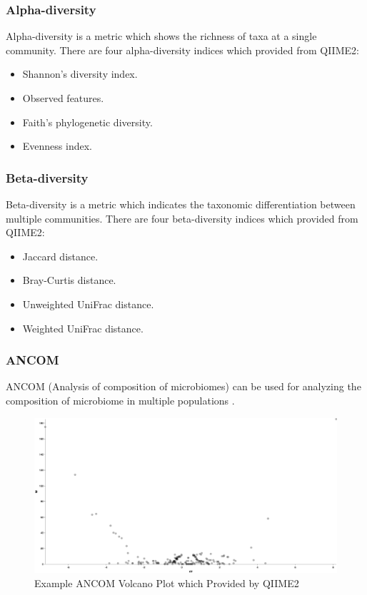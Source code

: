 \documentclass[a4paper]{article}
\begin{document}
            \subsubsection{Alpha-diversity}
                Alpha-diversity is a metric which shows the richness of taxa at a single community. There are four alpha-diversity indices which provided from QIIME2:
                \begin{itemize}
                    \item Shannon's diversity index.
                    \item Observed features.
                    \item Faith's phylogenetic diversity.
                    \item Evenness index.
                \end{itemize}

            \subsubsection{Beta-diversity}
                Beta-diversity is a metric which indicates the taxonomic differentiation between multiple communities. There are four beta-diversity indices which provided from QIIME2:
                \begin{itemize}
                    \item Jaccard distance.
                    \item Bray-Curtis distance.
                    \item Unweighted UniFrac distance.
                    \item Weighted UniFrac distance.
                \end{itemize}

            \subsubsection{ANCOM}
                ANCOM (Analysis of composition of microbiomes) can be used for analyzing the composition of microbiome in multiple populations \cite{ANCOM1}.

                \begin{figure}[p]
                    \centering
                    \includegraphics[width=0.8 \linewidth]{figures/ANCOM/example.png}
                    \caption{Example ANCOM Volcano Plot which Provided by QIIME2 \protect\cite{qiime1, qiime2}}
                    \label{fig:ancom-example}
                \end{figure}
\end{document}
